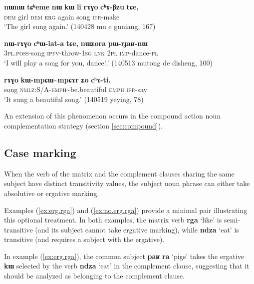 \documentclass[oneside,a4paper,11pt]{article}
\newcommand{\ipa}[1]{\textbf{\phon#1}} %
\newcommand{\jpg}[2]{\ipa{#1} `#2'} %
\newcommand{\tld}{\textasciitilde{}}
\begin{document}
\begin{exe}
\ex \label{ex:rAGo.chABzu}
\gll \ipa{nɯnɯ} 	\ipa{tɕʰeme} 	\ipa{nɯ} 	\ipa{kɯ} 	\ipa{li} 	\ipa{rɤɣo} 	\ipa{cʰɤ-βzu} 	\ipa{tɕe,} \\
\textsc{dem} girl \textsc{dem} \textsc{erg} again song \textsc{ifr}-make \\
\glt `The girl sung again.' (140428 mu e guniang, 167)
\end{exe}

\begin{exe}
\ex \label{ex:rAGo.chWlata}
\gll 
\ipa{nɯ-rɤɣo} 	\ipa{cʰɯ-lat-a} 	\ipa{tɕe,} 	\ipa{nɯʑora} 	\ipa{pɯ-rɟaʁ-nɯ} \\
\textsc{3pl.poss}-song \textsc{ipfv}-throw-\textsc{1sg} \textsc{lnk} \textsc{2pl} \textsc{imp}-dance-\textsc{pl} \\
\glt `I will play a song for you, dance!.' (140513 mutong de disheng, 100)
\end{exe}

\begin{exe}
\ex \label{ex:rAGo.chAti}
\gll 
\ipa{rɤɣo} 	\ipa{kɯ-mpɕɯ\tld{}mpɕɤr} 	\ipa{ʑo} 	\ipa{cʰɤ-ti.} \\
song \textsc{nmlz:S/A-emph}\tld{}be.beautiful \textsc{emph} \textsc{ifr}-say \\
\glt `It sung a beautiful song.' (140519 yeying, 78)
\end{exe}

An extension of this phenomenon occurs in the compound action noun complementation strategy (section \ref{sec:compound}).

\subsection{Case marking}
When the verb of the matrix and the complement clauses sharing the same subject have distinct transitivity values, the subject noun phrase can either take absolutive or ergative marking. 

Examples (\ref{ex:erg.rga}) and (\ref{ex:no.erg.rga}) provide a minimal pair illustrating this optional treatment. In both examples, the matrix verb \jpg{rga}{like} is semi-transitive (and its subject cannot take ergative marking), while \jpg{ndza}{eat} is transitive (and requires a subject with the ergative).

In example (\ref{ex:erg.rga}), the common subject \ipa{paʁ} \ipa{ra}  `pigs' takes the ergative \ipa{kɯ} selected by the verb  \jpg{ndza}{eat} in the complement clause, suggesting that it should be analyzed as belonging to the complement clause.
\end{document}

